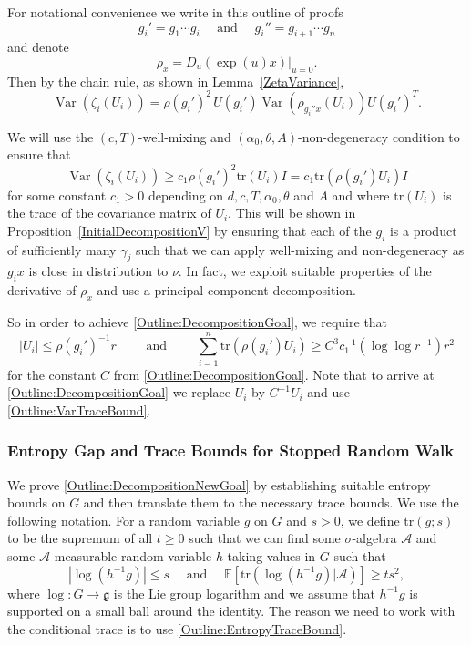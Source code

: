 \documentclass[10pt, english,oneside,reqno]{amsart}
\theoremstyle{plain}
\theoremstyle{remark}
\numberwithin{equation}{section}
\numberwithin{figure}{section}
\DeclareMathOperator{\var}{Var}
\newcommand{\tr}{\mathrm{tr}}
\newcommand{\E}{\mathbb{E}}
\begin{document}
For notational convenience we write in this outline of proofs $$g_i' = g_1\cdots g_i \quad \text{ and } \quad g_i'' = g_{i + 1} \cdots g_n$$ and denote $$\rho_x = D_u(\exp(u)x)|_{u = 0}.$$ Then by the chain rule, as shown in Lemma~\ref{ZetaVariance}, $$\var(\zeta_i(U_i)) = \rho(g_i')^2 \, U(g_i')\var(\rho_{g_i''x}(U_i)) U(g_i')^T.$$

We will use the $(c,T)$-well-mixing and $(\alpha_0,\theta, A)$-non-degeneracy condition to ensure that 
\begin{equation}\label{Outline:VarTraceBound}
    \var(\zeta_i(U_i)) \geq  c_1 \rho(g_i')^2\tr(U_i)I = c_1 \tr(\rho(g_i')U_i)I
\end{equation}
for some constant $c_1 > 0$ depending on $d,c,T,\alpha_0,\theta$ and $A$ and where $\tr(U_i)$ is the trace of the covariance matrix of $U_i$. This will be shown in Proposition~\ref{InitialDecompositionV} by ensuring that each of the $g_i$ is a product of sufficiently many $\gamma_j$ such that we can apply well-mixing and non-degeneracy as $g_ix$ is close in distribution to $\nu$. In fact, we exploit suitable properties of the derivative of $\rho_x$ and use a principal component decomposition.


So in order to achieve \eqref{Outline:DecompositionGoal}, we require that 
\begin{equation}\label{Outline:DecompositionNewGoal}
    |U_i| \leq \rho(g_i')^{-1}r \quad\quad \text{ and } \quad\quad \sum_{i = 1}^n \tr(\rho(g_i')U_i) \geq C^3 c_1^{-1} ( \log \log r^{-1} ) r^2
\end{equation}
for the constant $C$ from \eqref{Outline:DecompositionGoal}. Note that to arrive at \eqref{Outline:DecompositionGoal} we replace $U_i$ by $C^{-1}U_i$ and use \eqref{Outline:VarTraceBound}.

\subsubsection*{\normalfont\textbf{Entropy Gap and Trace Bounds for Stopped Random Walk}} We prove \eqref{Outline:DecompositionNewGoal} by establishing suitable entropy bounds on $G$ and then translate them to the necessary trace bounds. We use the following notation. For a random variable $g$ on $G$ and $s > 0$, we define $\tr(g; s)$ to be the supremum of all $t\geq 0$ such that we can find some $\sigma$-algebra $\mathscr{A}$ and some $\mathscr{A}$-measurable random variable $h$ taking values in $G$ such that $$|\log(h^{-1}g)| \leq s \quad \text{ and } \quad \E[\tr(\log(h^{-1}g)|\mathscr{A})] \geq ts^2,$$ where $\log: G \to \mathfrak{g}$ is the Lie group logarithm and we assume that $h^{-1}g$ is supported on a small ball around the identity. The reason we need to work with the conditional trace is to use \eqref{Outline:EntropyTraceBound}. 
\end{document}
